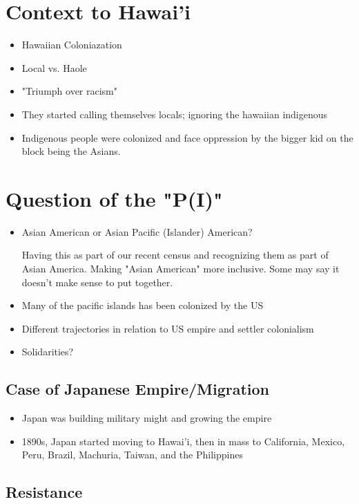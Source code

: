 \documentclass{article}
\begin{document}
\section*{Context to Hawai'i}

\begin{itemize}
  \item Hawaiian Coloniazation
  \item Local vs. Haole
  \item "Triumph over racism"
  \item They started calling themselves locals; ignoring the hawaiian indigenous
  \item Indigenous people were colonized and face oppression by the bigger kid on the block
    being the Asians.
\end{itemize}

\section*{Question of the "P(I)"}
\begin{itemize}
  \item Asian American or Asian Pacific (Islander) American?

    Having this as part of our recent census and recognizing them as part
    of Asian America. Making "Asian American" more inclusive.
    Some may say it doesn't make sense to put together.
  \item Many of the pacific islands has been colonized by the US
  \item Different trajectories in relation to US empire and settler colonialism
  \item Solidarities?
\end{itemize}

\subsection{Case of Japanese Empire/Migration}
\begin{itemize}
  \item Japan was building military might and growing the empire
  \item 1890s, Japan started moving to Hawai'i, then in mass to California, Mexico,
    Peru, Brazil, Machuria, Taiwan, and the Philippines
\end{itemize}

\subsection{Resistance}
\end{document}

